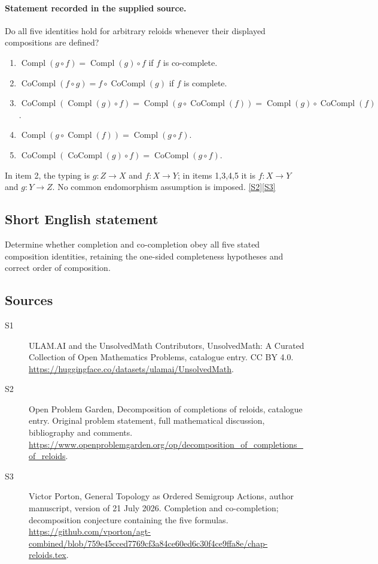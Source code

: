 \documentclass[11pt]{article}
\newcommand{\sref}[2]{\hyperlink{source:#1:#2}{[S#2]}}
\begin{document}
\paragraph{Statement recorded in the supplied source.}
Do all five identities hold for arbitrary reloids whenever their displayed compositions are defined?
\begin{enumerate}
\item $\operatorname{Compl}(g\circ f)=\operatorname{Compl}(g)\circ f$ if $f$ is co-complete.
\item $\operatorname{CoCompl}(f\circ g)=f\circ\operatorname{CoCompl}(g)$ if $f$ is complete.
\item $\operatorname{CoCompl}(\operatorname{Compl}(g)\circ f)=\operatorname{Compl}(g\circ\operatorname{CoCompl}(f))=\operatorname{Compl}(g)\circ\operatorname{CoCompl}(f)$.
\item $\operatorname{Compl}(g\circ\operatorname{Compl}(f))=\operatorname{Compl}(g\circ f)$.
\item $\operatorname{CoCompl}(\operatorname{CoCompl}(g)\circ f)=\operatorname{CoCompl}(g\circ f)$.
\end{enumerate}
In item 2, the typing is $g:Z\to X$ and $f:X\to Y$; in items 1,3,4,5 it is $f:X\to Y$ and $g:Y\to Z$. No common endomorphism assumption is imposed. \sref{statement}{2}\sref{statement}{3}
\subsection{Short English statement}
Determine whether completion and co-completion obey all five stated composition identities, retaining the one-sided completeness hypotheses and correct order of composition.
\subsection{Sources}
\begin{description}
\item[\hypertarget{source:statement:1}{S1}] ULAM.AI and the UnsolvedMath Contributors, UnsolvedMath: A Curated Collection of Open Mathematics Problems, catalogue entry. CC BY 4.0. \url{https://huggingface.co/datasets/ulamai/UnsolvedMath}.
\item[\hypertarget{source:statement:2}{S2}] Open Problem Garden, Decomposition of completions of reloids, catalogue entry. Original problem statement, full mathematical discussion, bibliography and comments. \url{https://www.openproblemgarden.org/op/decomposition_of_completions_of_reloids}.
\item[\hypertarget{source:statement:3}{S3}] Victor Porton, General Topology as Ordered Semigroup Actions, author manuscript, version of 21 July 2026. Completion and co-completion; decomposition conjecture containing the five formulas. \url{https://github.com/vporton/agt-combined/blob/759e45cced7769cf3a84ce60ed6c30f4ce9ffa8e/chap-reloids.tex}.
\end{description}
\label{end:statement}
\end{document}
